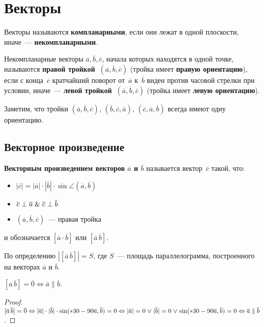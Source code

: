 \section{Векторы}
 Векторы называются \textbf{компланарными}, если они лежат в одной плоскости, иначе~--- \textbf{некомпланарными}.

Некомпланарные векторы $\overline a, \overline b, \overline c$, начала которых находятся в одной точке, называются \textbf{правой тройкой~$(\overline a, \overline b, \overline c)$} (тройка имеет \textbf{правую ориентацию}), если с конца~$\overline c$ кратчайший поворот от~$\overline a$ к~$\overline b$ виден против часовой стрелки при условии, иначе~--- \textbf{левой тройкой~$(\overline a, \overline b, \overline c)$} (тройка имеет \textbf{левую ориентацию}).

Заметим, что тройки $(\overline a, \overline b, \overline c)$, $(\overline b, \overline c, \overline a)$, $(\overline c, \overline a, \overline b)$ всегда имеют одну ориентацию.

\subsection{Векторное произведение}
 \textbf{Векторным произведением векторов $\overline a$ и $\overline b$} называется вектор~$\overline c$ такой, что:
\begin{itemize}
	\item $|\overline c| = |\overline a| \cdot |\overline b| \cdot \sin \angle(\overline a, \overline b)$
	\item $\overline c \perp \overline a \mathrel{\&} \overline c \perp \overline b$
	\item $(\overline a, \overline b, \overline c)$~--- правая тройка
\end{itemize}
и обозначается $[\overline a \cdot \overline b]$ или $[\overline a\,\overline b]$.

По определению $|[\overline a\,\overline b]| = S$, где $S$~--- площадь параллелограмма, построенного на векторах $\overline a$ и $\overline b$.

\begin{statement}
$[\overline a\,\overline b] = \overline 0 \Leftrightarrow \overline a \parallel \overline b$.
\end{statement}
\begin{proof}
$[\overline a\,\overline b] = \overline 0 \Leftrightarrow
|\overline a| \cdot |\overline b| \cdot \sin (*30-90\overline a, \overline b) = 0 \Leftrightarrow
|\overline a| = 0 \mathrel{\lor} |\overline b| = 0 \mathrel{\lor} \sin (*30-90\overline a, \overline b) = 0 \Leftrightarrow
\overline a \parallel \overline b$.
\end{proof}

